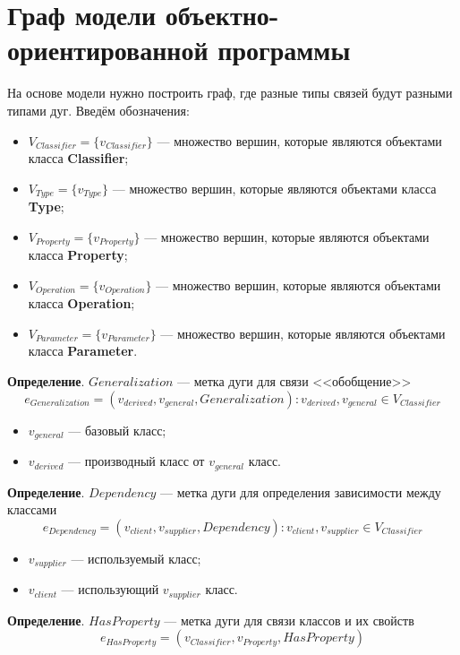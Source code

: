 \section{Граф модели объектно-ориентированной программы}

На основе модели нужно построить граф, где разные типы связей будут разными типами дуг.
Введём обозначения:
\begin{itemize}
\item $V_{Classifier} = \{ v_{Classifier} \}$ --- множество вершин, которые являются объектами класса \textbf{Classifier};
\item $V_{Type} = \{ v_{Type} \}$ --- множество вершин, которые являются объектами класса \textbf{Type};
\item $V_{Property} = \{ v_{Property} \}$ --- множество вершин, которые являются объектами класса \textbf{Property};
\item $V_{Operation} = \{ v_{Operation} \}$ --- множество вершин, которые являются объектами класса \textbf{Operation};
\item $V_{Parameter} = \{ v_{Parameter} \}$ --- множество вершин, которые являются объектами класса \textbf{Parameter}.
\end{itemize}

\textbf{Определение}. $Generalization$ --- метка дуги для связи <<обобщение>>
%
$$e_{Generalization} = (v_{derived}, v_{general}, Generalization) : v_{derived}, v_{general} \in V_{Classifier}$$

\begin{itemize}
\item $v_{general}$ --- базовый класс;
\item $v_{derived}$ --- производный класс от $v_{general}$ класс.
\end{itemize}

\textbf{Определение}. $Dependency$ --- метка дуги для определения зависимости
между классами
%
$$e_{Dependency} = (v_{client}, v_{supplier}, Dependency) : v_{client}, v_{supplier} \in V_{Classifier}$$

\begin{itemize}
\item $v_{supplier}$ --- используемый класс;
\item $v_{client}$ --- использующий $v_{supplier}$ класс.
\end{itemize}

\textbf{Определение}. $HasProperty$ --- метка дуги для связи классов и их свойств
%
$$e_{HasProperty} = (v_{Classifier}, v_{Property}, HasProperty)$$

